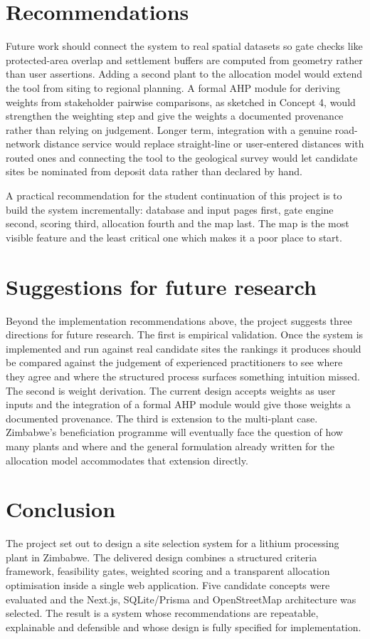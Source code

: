 \documentclass[12pt,a4paper]{report}
\begin{document}
\section{Recommendations}
Future work should connect the system to real spatial datasets so gate
checks like protected-area overlap and settlement buffers are computed
from geometry rather than user assertions. Adding a second plant to
the allocation model would extend the tool from siting to regional
planning. A formal AHP module for deriving weights from stakeholder
pairwise comparisons, as sketched in Concept 4, would strengthen the
weighting step and give the weights a documented provenance rather
than relying on judgement. Longer term, integration with a genuine
road-network distance service would replace straight-line or
user-entered distances with routed ones and connecting the tool to the
geological survey would let candidate sites be nominated from deposit
data rather than declared by hand.

A practical recommendation for the student continuation of this
project is to build the system incrementally: database and input pages
first, gate engine second, scoring third, allocation fourth and the
map last. The map is the most visible feature and the least critical
one which makes it a poor place to start.

\section{Suggestions for future research}
Beyond the implementation recommendations above, the project suggests
three directions for future research. The first is empirical
validation. Once the system is implemented and run against real
candidate sites the rankings it produces should be compared against
the judgement of experienced practitioners to see where they agree
and where the structured process surfaces something intuition missed.
The second is weight derivation. The current design accepts weights
as user inputs and the integration of a formal AHP module would give
those weights a documented provenance. The third is extension to the
multi-plant case. Zimbabwe's beneficiation programme will eventually
face the question of how many plants and where and the general
formulation already written for the allocation model accommodates that
extension directly.

\section{Conclusion}
The project set out to design a site selection system for a lithium
processing plant in Zimbabwe. The delivered design combines a
structured criteria framework, feasibility gates, weighted scoring and
a transparent allocation optimisation inside a single web application.
Five candidate concepts were evaluated and the Next.js, SQLite/Prisma
and OpenStreetMap architecture was selected. The result is a system
whose recommendations are repeatable, explainable and defensible and
whose design is fully specified for implementation.
\end{document}
